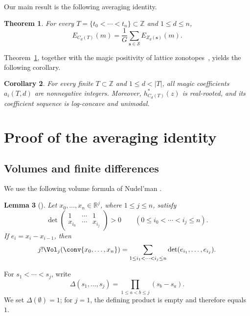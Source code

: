 \documentclass[a4paper,reqno,11pt,oneside]{amsart}
\newcommand{\Sc}{\mathcal{S}}
\newcommand{\ZZ}{\mathbb{Z}}
\newcommand{\RR}{\mathbb{R}}
\newtheorem{thm}{Theorem}[section]
\newtheorem{cor}[thm]{Corollary}
\newtheorem{lem}[thm]{Lemma}
\theoremstyle{definition}
\theoremstyle{remark}
\begin{document}
Our main result is the following averaging identity.

\begin{thm}\label{thm:average}
For every $T=\{t_0<\cdots<t_n\}\subset\ZZ$ and $1\le d\le n$,
\begin{equation}\label{eq:average}
    E_{C_d(T)}(m)=\frac{1}{G}\sum_{\mathbf s\in\Sc}E_{Z_d(\mathbf s)}(m).
\end{equation}
\end{thm}

Theorem~\ref{thm:average}, together with the magic positivity of lattice zonotopes~\cite{beck2019h}, yields the following corollary.

\begin{cor}\label{cor:magic}
For every finite $T\subset\ZZ$ and $1\le d<|T|$, all magic coefficients $a_i(T,d)$ are nonnegative integers. Moreover, $h^\ast_{C_d(T)}(z)$ is real-rooted, and its coefficient sequence is log-concave and unimodal.
\end{cor}



\section{Proof of the averaging identity}\label{sec:average-proof}

\subsection{Volumes and finite differences}

We use the following volume formula of Nudel'man \cite{nudel1975isoperimetric}.

\begin{lem}[{\cite[\S3, Theorem, pp.~282--283]{nudel1975isoperimetric}}]\label{lem:edge-volume}
Let $x_0,\ldots,x_n\in\RR^j$, where $1 \le j \le n$, satisfy
\[
\det
\begin{pmatrix}
1 & \cdots & 1\\
x_{i_0} & \cdots & x_{i_j}
\end{pmatrix}
>0
\qquad
(0\le i_0<\cdots<i_j\le n).
\]
If $e_i=x_i-x_{i-1}$, then
\[
j!\Vol_j(\conv\{x_0,\ldots,x_n\})
=
\sum_{1\le i_1<\cdots<i_j\le n}
\det(e_{i_1},\ldots,e_{i_j}).
\]
\end{lem}

For $s_1<\cdots<s_j$, write
\[
\Delta(s_1,\ldots,s_j)=\prod_{1\le a<b\le j}(s_b-s_a).
\]
We set $\Delta(\emptyset)=1$; for $j=1$, the defining product is empty and therefore equals $1$.
\end{document}
